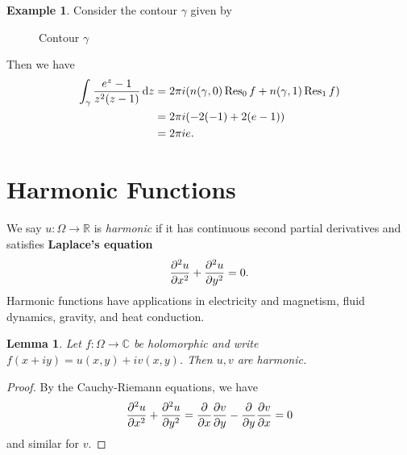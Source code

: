 \documentclass[leqno, openany]{memoir}
\newtheorem{lem}[thm]{Lemma}
\theoremstyle{definition}
\newtheorem{exm}[thm]{Example}
\theoremstyle{remark}
\theoremstyle{plain}
\theoremstyle{definition}
\theoremstyle{remark}
\newcommand{\R}{\mathbb{R}}
\newcommand{\C}{\mathbb{C}}
\begin{document}
\begin{exm}
    Consider the contour $\gamma$ given by
    \begin{figure}[H]
    \begin{center}
    \end{center}
    \caption{Contour $\gamma$}%
    \label{fig:}
    \end{figure}
    Then we have 
    \begin{align*} 
        \int_{\gamma} \frac{e^z-1}{z^2(z-1)} \dd{z} &= 2 \pi i (n(\gamma, 0) \Res_0 f + n(\gamma, 1) \Res_1 f) \\
                                                    &= 2 \pi i (-2(-1) + 2(e-1)) \\
                                                    &= 2 \pi i e.
    \end{align*}
\end{exm}


\section{Harmonic Functions}%
\label{sec:harmonic_functions}

We say $u \colon \Omega \to \R$ is \textit{harmonic} if it has continuous second partial derivatives and satisfies \textbf{Laplace's equation}
\[ \pdv[2]{u}{x} + \pdv[2]{u}{y} = 0. \]
Harmonic functions have applications in electricity and magnetism, fluid dynamics, gravity, and heat conduction.

\begin{lem}
    Let $f \colon \Omega \to \C$ be holomorphic and write $f(x+iy) = u(x,y) + iv(x,y)$. Then $u,v$ are harmonic.
\end{lem}

\begin{proof}
    By the Cauchy-Riemann equations, we have
    \[ \pdv[2]{u}{x} + \pdv[2]{u}{y} = \pdv{x} \pdv{v}{y} - \pdv{y} \pdv{v}{x} = 0 \]
    and similar for $v$.
\end{proof}
\end{document}

